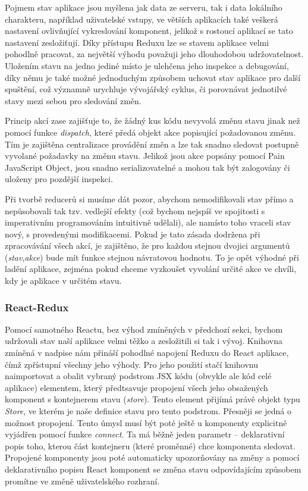 Pojmem stav aplikace jsou myšlena jak data ze serveru, tak i data lokálního charakteru, například uživatelské vstupy, ve větších aplikacích také veškerá nastavení ovlivňující vykreslování komponent, jelikož s rostoucí aplikací se tato nastavení zesložiťují. Díky přístupu Reduxu lze se stavem aplikace velmi pohodlně pracovat, za největší výhodu považuji jeho dlouhodobou udržovatelnost. Uložením stavu na jedno jediné místo je ulehčena jeho inspekce a debugování, díky němu je také možné jednoduchým způsobem uchovat stav aplikace pro další spuštění, což významně urychluje vývojářský cyklus, či porovnávat jednotilvé stavy mezi sebou pro sledování změn. 

Princip akcí zase zajišťuje to, že žádný kus kódu nevyvolá změnu stavu jinak než pomocí funkce \textit{dispatch}, které předá objekt akce popisující požadovanou změnu. Tím je zajištěna centralizace provádění změn a lze tak snadno sledovat postupně vyvolané požadavky na změnu stavu. Jelikož jsou akce popsány pomocí Pain JavaScript Object, jsou snadno serializovatelné a mohou tak být zalogovány či uloženy pro pozdější inspekci. 

Při tvorbě reducerů si musíme dát pozor, abychom nemodifikovali stav přímo a nepůsobovali tak tzv. vedlejší efekty (což bychom nejspíš ve spojitosti s imperativním programováním intuitivně udělali), ale namísto toho vraceli stav nový, s provedenými modifikacemi. Pokud je tato zásada dodržena při zpracovávání všech akcí, je zajištěno, že pro každou stejnou dvojici argumentů (\textit{stav},\textit{akce}) bude mít funkce stejnou návratovou hodnotu. To je opět výhodné při ladění aplikace, zejména pokud chceme vyzkoušet vyvolání určité akce ve chvíli, kdy je aplikace v určitém stavu.

\subsubsection{React-Redux}
Pomocí samotného Reactu, bez výhod zmíněných v předchozí sekci, bychom udržovali stav naší aplikace velmi těžko a zesložitili si tak i vývoj. Knihovna zmíněná v nadpise nám přináší pohodlné napojení Reduxu do React aplikace, čímž zpřístupní všechny jeho výhody. Pro jeho použití stačí knihovnu naimportovat a obalit vybraný podstrom JSX kódu (obvykle ale kód celé aplikace) elementem, který předtsavuje propojení všech jeho obsažených komponent s kontejnerem stavu (\textit{store}). Tento element přijímá právě objekt typu \textit{Store}, ve kterém je naše definice stavu pro tento podstrom. Přesněji se jedná o možnost propojení. Tento úmysl musí být poté ještě u komponenty explicitně vyjádřen pomocí funkce \textit{connect}. Ta má běžně jeden parametr -- deklarativní popis toho, kterou část kontejneru (které proměnné) chce komponenta sledovat. Propojené komponenty jsou poté automaticky upozorňovány na změny a pomocí deklarativního popisu React komponent se změna stavu odpovídajícím způsobem promítne ve změně uživatelského rozhraní.

